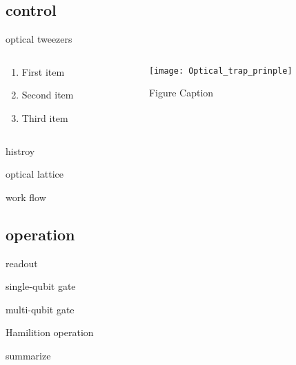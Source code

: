 \documentclass[18 pt]{beamer}
\begin{document}
\subsection{control}
\begin{frame}{optical tweezers}
  \begin{columns} %

    \begin{column}{.5\textwidth} %
    \begin{enumerate}[label=\arabic*., leftmargin=*, itemsep=30pt] %
        \item First item
        \item Second item
        \item Third item
    \end{enumerate}
    \end{column}
    
    \begin{column}{.5\textwidth} %
    \begin{figure}
      \centering
    \texttt{[image: Optical\_trap\_prinple]} %
    \caption{Figure Caption}
    \end{figure}
    \end{column}
    
  \end{columns}
\end{frame}
\begin{frame}{histroy}
  
\end{frame}
\begin{frame}{optical lattice}
  
\end{frame}
\begin{frame}{work flow}
\end{frame}

\subsection{operation}
\begin{frame}{readout}
\end{frame}
\begin{frame}{single-qubit gate}
  
\end{frame}
\begin{frame}{multi-qubit gate}
\end{frame}
\begin{frame}{Hamilition operation}
\end{frame}
\begin{frame}{summarize}
\end{frame}
\end{document}
